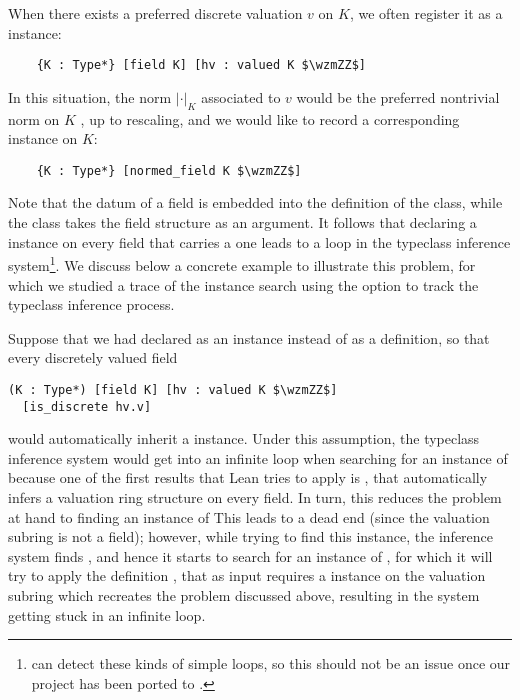 \documentclass[sigplan,screen]{acmart}
\begin{document}
When there exists a preferred discrete valuation $v$ on $K$, we often register it as a  instance:
\begin{lstlisting}
    {K : Type*} [field K] [hv : valued K $\wzmZZ$] 
\end{lstlisting}
In this situation, the norm $\lvert\cdot\rvert_K$ associated to $v$ would be the preferred nontrivial norm on $K$ , up to rescaling, and we would like to record a corresponding  instance on $K$:
\begin{lstlisting}
    {K : Type*} [normed_field K $\wzmZZ$] 
\end{lstlisting}
Note that the datum of a field is embedded into the definition of the  class, while the class  takes the field structure as an argument. It follows that declaring a  instance on every field that carries a  one leads to a loop in the typeclass inference system\footnote{\lean[4] can detect these kinds of simple loops, so this should not be an issue once our project has been ported to \lean[4].}. We discuss below a concrete example to illustrate this problem, for which we studied
a trace of the instance search using the option  to track the typeclass inference process.

Suppose that we had declared  as an instance instead of as a definition, so that every discretely valued field
\begin{lstlisting}
(K : Type*) [field K] [hv : valued K $\wzmZZ$]
  [is_discrete hv.v]
\end{lstlisting}
would automatically inherit a  instance.
Under this assumption, the typeclass inference system would get into an infinite loop when searching for an instance of
\relax 
because one of the first results that Lean tries to apply is , that automatically infers a valuation ring structure on every field. In turn, this reduces the problem at hand to finding an instance of 
This leads to a dead end (since the valuation subring is not a field); however, while trying to find this instance, the inference system finds \relax, and hence it starts to search for an instance of
, for which it will try to apply the definition , that as input requires a  instance on the valuation subring which recreates the problem discussed above, resulting in the system getting stuck in an infinite loop.
\end{document}
